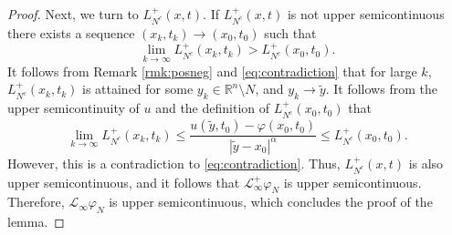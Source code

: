 \documentclass[11pt]{article}
\providecommand{\Linf}{\mathcal{L}_{\infty}}
\providecommand{\Lpos}{\mathcal{L}_{\infty}^+}
\providecommand{\Rn}{\mathbb{R}^n}
\numberwithin{equation}{section}
\theoremstyle{definition}
\begin{document}
\begin{proof}
Next, we turn to $L^+_{N^c}(x,t)$. If $L^+_{N^c}(x,t)$ is not upper semicontinuous there exists a sequence $(x_k,t_k) \to (x_0,t_0)$ such that
\begin{equation}\label{eq:contradiction}
        \lim_{k \to \infty} L^+_{N^c}(x_k,t_k) > L^+_{N^c}(x_0,t_0).
\end{equation}
It follows from Remark \ref{rmk:posneg}  and \eqref{eq:contradiction} that for large $k$, $ L^+_{N^c}(x_k,t_k)$ is attained for some $y_k \in \Rn \setminus N$, and $y_k \to \tilde{y}$. It follows from the upper semicontinuity of $u$ and the definition of $L^+_{N^c}(x_0,t_0)$ that
\begin{equation*}
     \lim_{k \to \infty} L^+_{N^c}(x_k,t_k) \leq \frac{u(\tilde{y},t_0)-\varphi(x_0,t_0)}{|\tilde{y}-x_0|^{\alpha}} \leq L^+_{N^c}(x_0,t_0).
\end{equation*}
However, this is a contradiction to \eqref{eq:contradiction}. Thus, $L^+_{N^c}(x,t)$ is also upper semicontinuous, and it follows that $\Lpos \varphi_{N}$ is upper semicontinuous. Therefore, $\Linf \varphi_{N}$ is upper semicontinuous, which concludes the proof of the lemma.
\end{proof}
\end{document}

